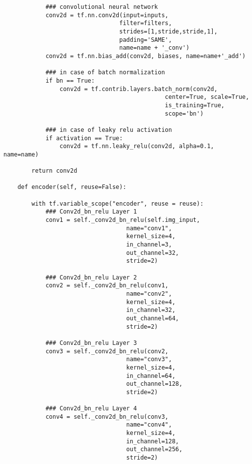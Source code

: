\begin{footnotesize}
\begin{lstlisting}
            ### convolutional neural network
            conv2d = tf.nn.conv2d(input=inputs,
                                 filter=filters,
                                 strides=[1,stride,stride,1],
                                 padding='SAME',
                                 name=name + '_conv')
            conv2d = tf.nn.bias_add(conv2d, biases, name=name+'_add')
            
            ### in case of batch normalization
            if bn == True:
                conv2d = tf.contrib.layers.batch_norm(conv2d, 
                                              center=True, scale=True, 
                                              is_training=True,
                                              scope='bn')
            
            ### in case of leaky relu activation
            if activation == True:
                conv2d = tf.nn.leaky_relu(conv2d, alpha=0.1, name=name)
        
        return conv2d
        
    def encoder(self, reuse=False):
        
        with tf.variable_scope("encoder", reuse = reuse):
            ### Conv2d_bn_relu Layer 1
            conv1 = self._conv2d_bn_relu(self.img_input,
                                   name="conv1",
                                   kernel_size=4,
                                   in_channel=3,
                                   out_channel=32,
                                   stride=2)

            ### Conv2d_bn_relu Layer 2
            conv2 = self._conv2d_bn_relu(conv1,
                                   name="conv2",
                                   kernel_size=4,
                                   in_channel=32,
                                   out_channel=64,
                                   stride=2)

            ### Conv2d_bn_relu Layer 3
            conv3 = self._conv2d_bn_relu(conv2,
                                   name="conv3",
                                   kernel_size=4,
                                   in_channel=64,
                                   out_channel=128,
                                   stride=2)

            ### Conv2d_bn_relu Layer 4
            conv4 = self._conv2d_bn_relu(conv3,
                                   name="conv4",
                                   kernel_size=4,
                                   in_channel=128,
                                   out_channel=256,
                                   stride=2)


\end{lstlisting}
\end{footnotesize}
